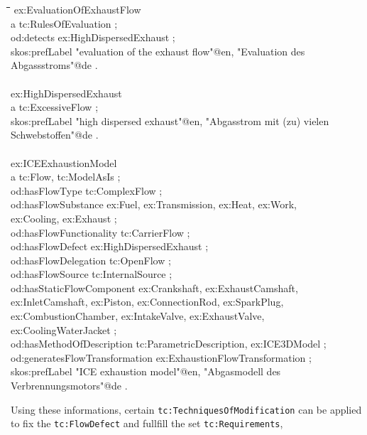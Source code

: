 \documentclass[a4paper,11pt]{article}
\newenvironment{code}{\tt \begin{tabbing}
\hskip12pt\=\hskip12pt\=\hskip12pt\=\hskip12pt\=\hskip5cm\=\hskip5cm\=\kill}
{\end{tabbing}}
\begin{document}
\begin{itemize}
    \begin{code}    
    ex:EvaluationOfExhaustFlow \\
    \> a tc:RulesOfEvaluation ; \\
    \> od:detects ex:HighDispersedExhaust ; \\
    \> skos:prefLabel "evaluation of the exhaust flow"@en, "Evaluation des  \\
    \> Abgassstroms"@de . \\
    \\
    ex:HighDispersedExhaust \\
    \> a tc:ExcessiveFlow ; \\
    \> skos:prefLabel "high dispersed exhaust"@en, "Abgasstrom mit (zu) vielen  \\
    \> Schwebstoffen"@de . \\
    \\
    ex:ICEExhaustionModel \\
    \> a tc:Flow, tc:ModelAsIs ; \\
    \> od:hasFlowType tc:ComplexFlow ; \\
    \> od:hasFlowSubstance ex:Fuel, ex:Transmission, ex:Heat, ex:Work,  \\
    \> ex:Cooling, ex:Exhaust ; \\
    \> od:hasFlowFunctionality tc:CarrierFlow ; \\
    \> od:hasFlowDefect ex:HighDispersedExhaust ; \\
    \> od:hasFlowDelegation tc:OpenFlow ; \\
    \> od:hasFlowSource tc:InternalSource ; \\
    \> od:hasStaticFlowComponent ex:Crankshaft, ex:ExhaustCamshaft,  \\
    \> ex:InletCamshaft, ex:Piston, ex:ConnectionRod, ex:SparkPlug,  \\
    \> ex:CombustionChamber, ex:IntakeValve, ex:ExhaustValve,  \\
    \> ex:CoolingWaterJacket ; \\
    \> od:hasMethodOfDescription tc:ParametricDescription, ex:ICE3DModel ; \\
    \> od:generatesFlowTransformation ex:ExhaustionFlowTransformation ; \\
    \> skos:prefLabel "ICE exhaustion model"@en, "Abgasmodell des Verbrennungsmotors"@de . \\
    \end{code}

    Using these informations, certain \texttt{tc:TechniquesOfModification} can 
    be applied to fix the \texttt{tc:FlowDefect} and fullfill the set 
    \texttt{tc:Requirements},
    

\end{itemize}
\end{document}
